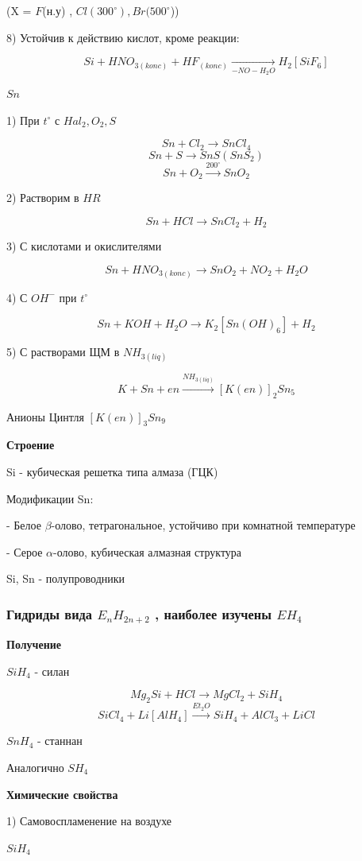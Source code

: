 \documentclass[14pt,a4paper]{scrartcl}
\begin{document}
(X = $F$(н.у) , $Cl (300^{\circ}), Br(500^{\circ}$))

8) Устойчив к действию кислот, кроме реакции:

$$Si + HNO_{3(konc)} + HF_{(konc)} \xrightarrow[-NO-H_2O]\ H_2[SiF_6]$$

$Sn$

1) При $t^{\circ}$ с $Hal_2, O_2, S$

$$Sn + Cl_2 \rightarrow SnCl_4$$
$$Sn+ S \rightarrow SnS (SnS_2)$$
$$Sn + O_2 \xrightarrow{200^{\circ}} SnO_2$$

2) Растворим в $HR$

$$Sn + HCl \rightarrow SnCl_2 + H_2$$

3) С кислотами и окислителями


$$Sn + HNO_{3(konc)} \rightarrow SnO_2 + NO_2 + H_2O$$

4) С $OH^-$  при $t^{\circ}$

$$Sn + KOH + H_2O \rightarrow K_2[Sn(OH)_6] + H_2$$

5) С растворами ЩМ в $NH_{3(liq)}$

$$K + Sn + en \xrightarrow{NH_{3(liq)}} [K(en)]_2Sn_5$$

Анионы Цинтля $[K(en)]_3Sn_9$

\textbf{Строение}

Si - кубическая решетка типа алмаза (ГЦК)

Модификации Sn: 

- Белое $\beta$-олово, тетрагональное, устойчиво при комнатной температуре

- Серое $\alpha$-олово, кубическая алмазная структура

Si, Sn - полупроводники


\subsubsection{Гидриды вида $E_nH_{2n+2}$ , наиболее изучены $EH_4$}

\textbf{Получение}

$SiH_4$ - силан

$$Mg_2Si + HCl \rightarrow MgCl_2 + SiH_4$$
$$SiCl_4 + Li[AlH_4] \xrightarrow{Et_2O} SiH_4 + AlCl_3 + LiCl$$

$SnH_4$ - станнан

Аналогично $SH_4$

\textbf{Химические свойства}

1) Самовоспламенение на воздухе

$SiH_4$
\end{document}
